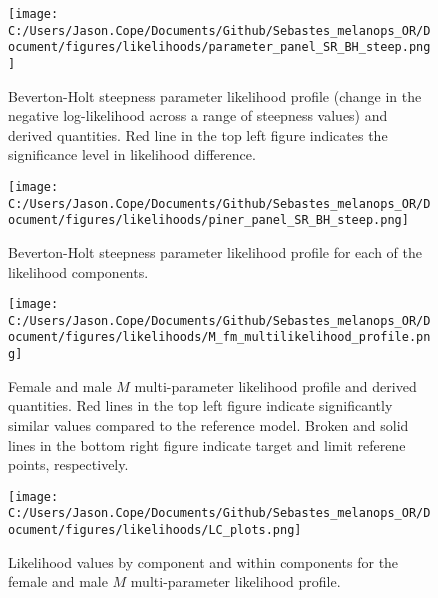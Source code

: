 \documentclass[11pt,
  letterpaper,
]{article}
\begin{document}
\pagebreak

\begin{figure}
{\centering
\texttt{[image: C:/Users/Jason.Cope/Documents/Github/Sebastes\_melanops\_OR/Document/figures/likelihoods/parameter\_panel\_SR\_BH\_steep.png]}
}
\caption{Beverton-Holt steepness parameter likelihood profile (change in the negative log-likelihood across a range of steepness values) and derived quantities. Red line in the top left figure indicates the significance level in likelihood difference.\label{fig:steepness-profile}}
\end{figure}

\pagebreak

\begin{figure}
{\centering
\texttt{[image: C:/Users/Jason.Cope/Documents/Github/Sebastes\_melanops\_OR/Document/figures/likelihoods/piner\_panel\_SR\_BH\_steep.png]}
}
\caption{Beverton-Holt steepness parameter likelihood profile for each of the likelihood components.\label{fig:steepness-profile-components}}
\end{figure}

\pagebreak

\begin{figure}
{\centering
\texttt{[image: C:/Users/Jason.Cope/Documents/Github/Sebastes\_melanops\_OR/Document/figures/likelihoods/M\_fm\_multilikelihood\_profile.png]}
}
\caption{Female and male $M$ multi-parameter likelihood profile and derived quantities. Red lines in the top left figure indicate significantly similar values compared to the reference model. Broken and solid lines in the bottom right figure indicate target and limit referene points, respectively.\label{fig:M-multiprofile-combo}}
\end{figure}

\pagebreak

\begin{figure}
{\centering
\texttt{[image: C:/Users/Jason.Cope/Documents/Github/Sebastes\_melanops\_OR/Document/figures/likelihoods/LC\_plots.png]}
}
\caption{Likelihood values by component and within components for the female and male $M$ multi-parameter likelihood profile.\label{fig:M-multiprofile-like-components}}
\end{figure}
\end{document}
